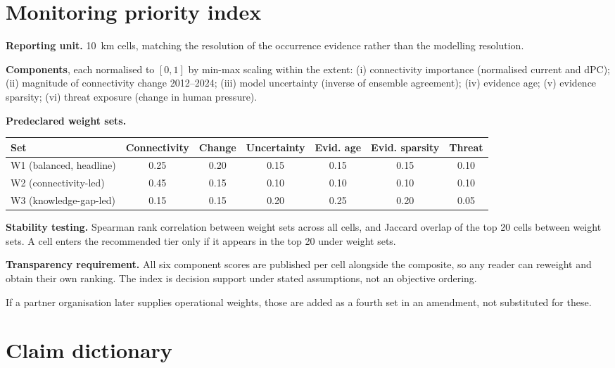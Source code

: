 \section{Monitoring priority index}

\textbf{Reporting unit.} \SI{10}{\kilo\metre} cells, matching the resolution of
the occurrence evidence rather than the modelling resolution.

\textbf{Components}, each normalised to $[0,1]$ by min-max scaling within the
extent: (i) connectivity importance (normalised current and dPC);
(ii) magnitude of connectivity change 2012--2024; (iii) model uncertainty
(inverse of ensemble agreement); (iv) evidence age; (v) evidence sparsity;
(vi) threat exposure (change in human pressure).

\textbf{Predeclared weight sets.}

\begin{center}
\begin{tabular}{@{}lcccccc@{}}
\toprule
Set & Connectivity & Change & Uncertainty & Evid. age & Evid. sparsity & Threat \\
\midrule
W1 (balanced, headline) & 0.25 & 0.20 & 0.15 & 0.15 & 0.15 & 0.10 \\
W2 (connectivity-led) & 0.45 & 0.15 & 0.10 & 0.10 & 0.10 & 0.10 \\
W3 (knowledge-gap-led) & 0.15 & 0.15 & 0.20 & 0.25 & 0.20 & 0.05 \\
\bottomrule
\end{tabular}
\end{center}

\textbf{Stability testing.} Spearman rank correlation between weight sets across
all cells, and Jaccard overlap of the top 20 cells between weight sets. A cell
enters the recommended tier only if it appears in the top 20 under
 weight sets.

\textbf{Transparency requirement.} All six component scores are published per
cell alongside the composite, so any reader can reweight and obtain their own
ranking. The index is decision support under stated assumptions, not an
objective ordering.

 If a partner
organisation later supplies operational weights, those are added as a fourth
set in an amendment, not substituted for these.

\section{Claim dictionary}
\label{sec:dict}

